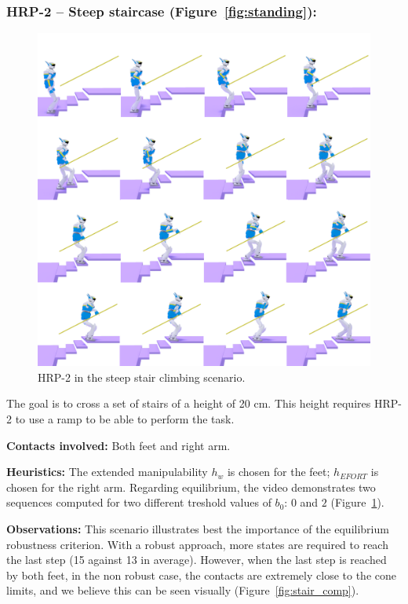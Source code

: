 \subsubsection{HRP-2 -- Steep staircase (Figure~\ref{fig:standing}):}

\begin{figure}
  \centering
  \includegraphics[width=0.5\linewidth]{figures/stair}
  \caption{
           HRP-2 in the steep stair climbing scenario. }
		   \label{fig:stair_robust}
\end{figure}

The goal is to cross a set of stairs of a height of 20 cm. This height requires HRP-2 to use a ramp to be able to perform the task.

\noindent\textbf{Contacts involved:} Both feet and right arm.

\noindent\textbf{Heuristics:} The extended manipulability $h_w$ is chosen for the feet; $h_{EFORT}$ is chosen for the right arm.
Regarding equilibrium, the video demonstrates two sequences computed for two different treshold values of $b_0$: $0$ and $2$ (Figure~\ref{fig:stair_robust}). 

\noindent\textbf{Observations:}
This scenario illustrates best the importance of the equilibrium robustness criterion.
With a robust approach, more states are required to reach the last step (15 against 13 in average).
However, when the last step is reached by both feet, in the non robust case, the contacts are extremely close to 
the cone limits, and we believe this can be seen visually (Figure~\ref{fig:stair_comp}).


